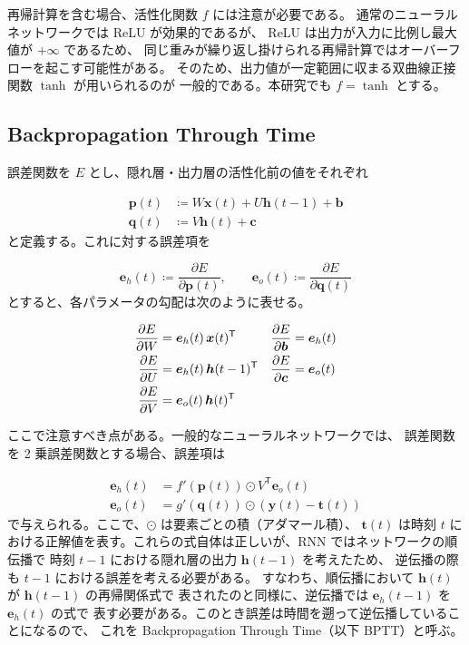 \documentclass[a4paper,11pt,openany]{ltjsreport}
\begin{document}
再帰計算を含む場合、活性化関数 $f$ には注意が必要である。
通常のニューラルネットワークでは ReLU が効果的であるが、
ReLU は出力が入力に比例し最大値が $+\infty$ であるため、
同じ重みが繰り返し掛けられる再帰計算ではオーバーフローを起こす可能性がある。
そのため、出力値が一定範囲に収まる双曲線正接関数 $\tanh$ が用いられるのが
一般的である\cite{sugomori2019}。本研究でも $f = \tanh$ とする。

\subsection{Backpropagation Through Time}

誤差関数を $E$ とし、隠れ層・出力層の活性化前の値をそれぞれ

\begin{align}
  \bm{p}(t) &\coloneqq W\bm{x}(t) + U\bm{h}(t-1) + \bm{b} \label{eq:p}\\
  \bm{q}(t) &\coloneqq V\bm{h}(t) + \bm{c}                \label{eq:q}
\end{align}
と定義する。これに対する誤差項を

\begin{equation}
  \bm{e}_h(t) \coloneqq \frac{\partial E}{\partial \bm{p}(t)}, \qquad
  \bm{e}_o(t) \coloneqq \frac{\partial E}{\partial \bm{q}(t)}
  \label{eq:err}
\end{equation}
とすると、各パラメータの勾配は次のように表せる。

\begin{align}
  \frac{\partial E}{\partial W} &= \bm{e}_h(t)\,\bm{x}(t)^{\mathsf{T}} &
  \frac{\partial E}{\partial \bm{b}} &= \bm{e}_h(t) \notag\\
  \frac{\partial E}{\partial U} &= \bm{e}_h(t)\,\bm{h}(t-1)^{\mathsf{T}} &
  \frac{\partial E}{\partial \bm{c}} &= \bm{e}_o(t) \label{eq:grads}\\
  \frac{\partial E}{\partial V} &= \bm{e}_o(t)\,\bm{h}(t)^{\mathsf{T}} & & \notag
\end{align}

ここで注意すべき点がある。一般的なニューラルネットワークでは、
誤差関数を 2 乗誤差関数とする場合、誤差項は

\begin{align}
  \bm{e}_h(t) &= f'(\bm{p}(t)) \odot V^{\mathsf{T}}\bm{e}_o(t) \label{eq:eh}\\
  \bm{e}_o(t) &= g'(\bm{q}(t)) \odot \left(\bm{y}(t) - \bm{t}(t)\right) \label{eq:eo}
\end{align}
で与えられる。ここで、$\odot$ は要素ごとの積（アダマール積）、
$\bm{t}(t)$ は時刻 $t$ における正解値を表す。これらの式自体は正しいが、RNN ではネットワークの順伝播で
時刻 $t-1$ における隠れ層の出力 $\bm{h}(t-1)$ を考えたため、
逆伝播の際も $t-1$ における誤差を考える必要がある。
すなわち、順伝播において $\bm{h}(t)$ が $\bm{h}(t-1)$ の再帰関係式で
表されたのと同様に、逆伝播では $\bm{e}_h(t-1)$ を $\bm{e}_h(t)$ の式で
表す必要がある。このとき誤差は時間を遡って逆伝播していることになるので、
これを Backpropagation Through Time（以下 BPTT）と呼ぶ\cite{werbos1990}。
\end{document}
